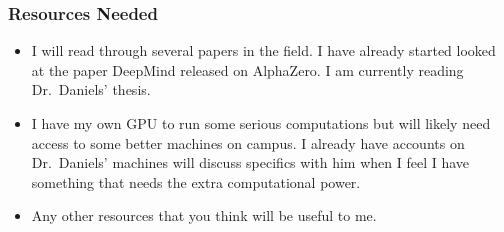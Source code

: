 \documentclass[]{article}
\providecommand{\tightlist}{%
  \setlength{\itemsep}{0pt}\setlength{\parskip}{0pt}}
\begin{document}
\subsubsection{Resources Needed}\label{resources-needed}

\begin{itemize}
\tightlist
\item
  I will read through several papers in the field. I have already
  started looked at the paper DeepMind released on AlphaZero. I am
  currently reading Dr.~Daniels' thesis.
\item
  I have my own GPU to run some serious computations but will likely
  need access to some better machines on campus. I already have accounts
  on Dr.~Daniels' machines will discuss specifics with him when I feel I
  have something that needs the extra computational power.
\item
  Any other resources that you think will be useful to me.
\end{itemize}
\end{document}

